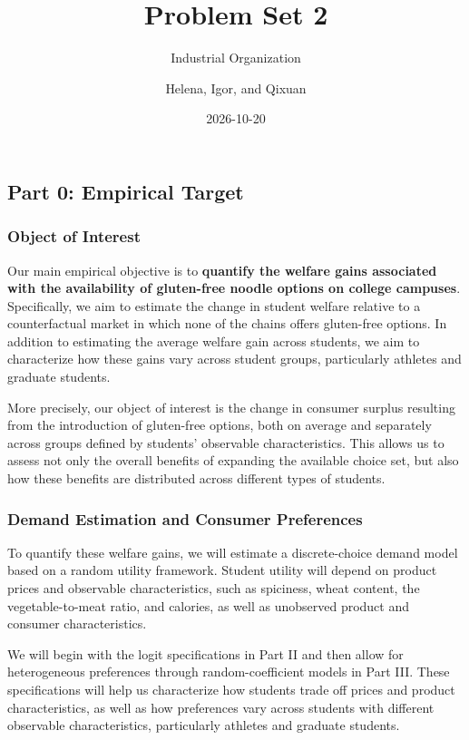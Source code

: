 \documentclass[
  11pt,
]{article}
\title{Problem Set 2}
\subtitle{Industrial Organization}
\author{Helena, Igor, and Qixuan}
\date{2026-10-20}
\newcounter{none} %
\begin{document}
\maketitle


\subsection{Part 0: Empirical Target}\label{part-0-empirical-target}

\subsubsection{Object of Interest}\label{object-of-interest}

Our main empirical objective is to
\textbf{quantify the welfare gains associated with the availability of gluten-free noodle options on college campuses}.
Specifically, we aim to estimate the change in student welfare relative
to a counterfactual market in which none of the chains offers
gluten-free options. In addition to estimating the average welfare gain
across students, we aim to characterize how these gains vary across
student groups, particularly athletes and graduate students.

More precisely, our object of interest is the change in consumer surplus
resulting from the introduction of gluten-free options, both on average
and separately across groups defined by students' observable
characteristics. This allows us to assess not only the overall benefits
of expanding the available choice set, but also how these benefits are
distributed across different types of students.

\subsubsection{Demand Estimation and Consumer
Preferences}\label{demand-estimation-and-consumer-preferences}

To quantify these welfare gains, we will estimate a discrete-choice
demand model based on a random utility framework. Student utility will
depend on product prices and observable characteristics, such as
spiciness, wheat content, the vegetable-to-meat ratio, and calories, as
well as unobserved product and consumer characteristics.

We will begin with the logit specifications in Part II and then allow
for heterogeneous preferences through random-coefficient models in Part
III. These specifications will help us characterize how students trade
off prices and product characteristics, as well as how preferences vary
across students with different observable characteristics, particularly
athletes and graduate students.
\end{document}

